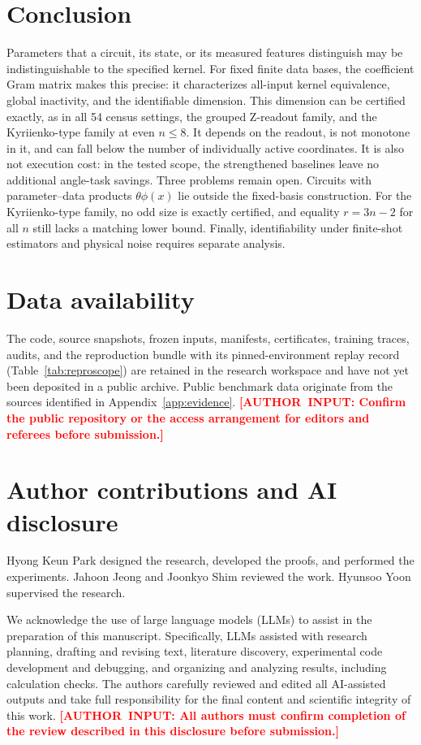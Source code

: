 \documentclass[a4paper,twocolumn,11pt,unpublished]{quantumarticle}
\newcommand{\authorinput}[1]{\textcolor{red}{\textbf{[\mbox{AUTHOR INPUT}: #1]}}}
\begin{document}
\section{Conclusion}
Parameters that a circuit, its state, or its measured features
distinguish may be indistinguishable to the specified kernel. For
fixed finite data bases, the coefficient Gram matrix makes this
precise: it characterizes all-input kernel equivalence, global
inactivity, and the identifiable dimension. This dimension can be
certified exactly, as in all 54 census settings, the grouped Z-readout
family, and the Kyriienko-type family at even $n\le8$. It depends on
the readout, is not monotone in it, and can fall below the number of
individually active coordinates. It is also not execution cost: in the
tested scope, the strengthened baselines leave no additional
angle-task savings. Three problems remain open. Circuits with
parameter--data products $\theta\phi(x)$ lie outside the fixed-basis
construction. For the Kyriienko-type family, no odd size is exactly
certified, and equality $r=3n-2$ for all $n$ still lacks a matching
lower bound. Finally, identifiability under finite-shot estimators and
physical noise requires separate analysis.

\section*{Data availability}
The code, source snapshots, frozen inputs, manifests, certificates,
training traces, audits, and the reproduction bundle with its
pinned-environment replay record (Table~\ref{tab:reproscope}) are
retained in the research workspace and have not yet been deposited
in a public archive. Public benchmark data originate from the sources
identified in Appendix~\ref{app:evidence}.
\authorinput{Confirm the public repository or the access arrangement
for editors and referees before submission.}

\section*{Author contributions and AI disclosure}
Hyong Keun Park designed the research, developed the proofs, and
performed the experiments. Jahoon Jeong and Joonkyo Shim reviewed
the work. Hyunsoo Yoon supervised the research.

We acknowledge the use of large language models (LLMs) to assist in
the preparation of this manuscript. Specifically, LLMs assisted with
research planning, drafting and revising text, literature discovery,
experimental code development and debugging, and organizing and
analyzing results, including calculation checks. The authors carefully
reviewed and edited all AI-assisted outputs and take full
responsibility for the final content and scientific integrity of
this work.
\authorinput{All authors must confirm completion of the review
described in this disclosure before submission.}
\end{document}
